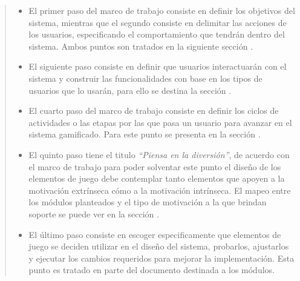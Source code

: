     \begin{quote}
    \begin{itemize}
    \item El primer paso del marco de trabajo consiste en definir los objetivos del
          sistema, mientras que el segundo consiste en delimitar las acciones de los
          usuarios, especificando el comportamiento que tendrán dentro del sistema.
          Ambos puntos son tratados en la siguiente sección .\\

    \item El siguiente paso consiste en definir que usuarios interactuarán con el sistema
          y construir las funcionalidades con base en los tipos de usuarios que lo
          usarán, para ello se destina la sección .\\

    \item El cuarto paso del marco de trabajo consiste en definir los ciclos de actividades
          o las etapas por las que pasa un usuario para avanzar en el sistema gamificado.
          Para este punto se presenta en la sección .\\

    \item El quinto paso tiene el titulo {\it``Piensa en la diversión''}, de acuerdo con el
          marco de trabajo para poder solventar este punto el diseño de los elementos de
          juego debe contemplar tanto elementos que apoyen a la motivación extrínseca cómo
          a la motivación intrínseca. El mapeo entre los módulos planteados y el tipo de
          motivación a la que brindan soporte se puede ver en la sección
          .\\

    \item El último paso consiste en escoger especificamente que elementos de juego se
          deciden utilizar en el diseño del sistema, probarlos, ajustarlos y ejecutar
          los cambios requeridos para mejorar la implementación. Esta punto es tratado en
          parte del documento destinada a los módulos.
    \end{itemize}
    \end{quote}



